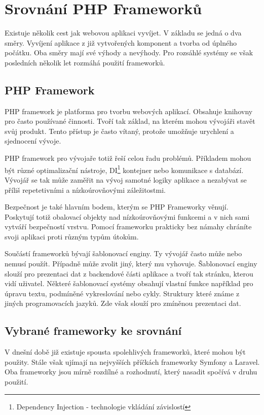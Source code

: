 \documentclass[czech,BP]{thesiskiv}
\begin{document}
\section{Srovnání PHP Frameworků}
	\par Existuje několik cest jak webovou aplikaci vyvíjet. V základu se jedná o dva směry. Vyvíjení aplikace z již vytvořených komponent a tvorba od úplného počátku. Oba směry mají své výhody a nevýhody. Pro rozsáhlé systémy se však posledních několik let rozmáhá použití frameworků.
	\subsection{PHP Framework}
	\par PHP framework je platforma pro tvorbu webových aplikací. Obsahuje knihovny pro často používané činnosti. Tvoří tak základ, na kterém mohou vývojáři stavět svůj produkt. Tento přístup je často vítaný, protože umožňuje urychlení a sjednocení vývoje.
	\par PHP framework pro vývojaře totiž řeší celou řadu problémů. Příkladem mohou být různé optimalizační nástroje, DI\footnote{Dependency Injection - technologie vkládání závislostí} kontejner nebo komunikace s databází. Vývojář se tak může zaměřit na vývoj samotné logiky aplikace a nezabývat se příliš repetetivními a nízkoúrovňovými záležitostmi.
	\par Bezpečnost je také hlavním bodem, kterým se PHP Frameworky věnují. Poskytují totiž obalovací objekty nad nízkoúrovňovými funkcemi a v nich sami vytváří bezpečností vrstvu. Pomocí frameworku prakticky bez námahy chráníte svoji aplikaci proti různým typům útokům. 
	\par Součástí frameworků bývají šablonovací enginy. Ty vývojář často může nebo nemusí použít. Případně může zvolit jiný, který mu vyhovuje. Šablonovací enginy slouží pro prezentaci dat z backendové části aplikace a tvoří tak stránku, kterou vidí uživatel. Některé šablonovací systémy obsahují vlastní funkce například pro úpravu textu, podmíněné vykreslování nebo cykly. Struktury které známe z jiných programovacích jazyků. Zde však slouží pro zmíněnou prezentaci dat.
	\subsection{Vybrané frameworky ke srovnání}
	\par V dnešní době již existuje spousta spolehlivých frameworků, které mohou být použity. Stále však ujímají na nejvyšších příčkách frameworky Symfony a Laravel. Oba frameworky jsou mírně rozdílné a rozhodnutí, který nasadit spočívá v druhu použití.
\end{document}
